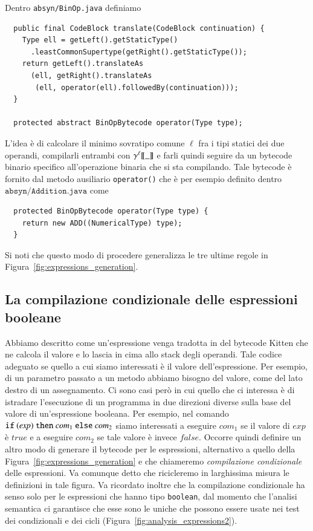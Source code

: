 Dentro \texttt{absyn/BinOp.java} definiamo
%
\begin{verbatim}
  public final CodeBlock translate(CodeBlock continuation) {
    Type ell = getLeft().getStaticType()
      .leastCommonSupertype(getRight().getStaticType());
    return getLeft().translateAs
      (ell, getRight().translateAs
       (ell, operator(ell).followedBy(continuation)));
  }

  protected abstract BinOpBytecode operator(Type type);
\end{verbatim}
%
L'idea \`e di calcolare il minimo sovratipo comune $\ell$
fra i tipi statici dei due operandi, compilarli entrambi con
${\gamma^{{\mathit{\ell}}}[\![{\_}]\!]}$ e farli quindi seguire da un bytecode binario
specifico all'operazione binaria che si sta compilando. Tale bytecode
\`e fornito dal metodo ausiliario \texttt{operator()} che \`e per esempio
definito dentro $\mathtt{absyn/Addition.java}$ come
%
\begin{verbatim}
  protected BinOpBytecode operator(Type type) {
    return new ADD((NumericalType) type);
  }
\end{verbatim}
%
Si noti che questo modo di procedere generalizza le tre ultime regole
in Figura~\ref{fig:expressions_generation}.
%
\subsection{La compilazione condizionale delle espressioni booleane}
  \label{subsec:conditional_generation}
%
Abbiamo descritto come un'espressione venga tradotta in del bytecode
Kitten che ne calcola il valore e lo lascia in cima allo stack degli
operandi. Tale codice \e adeguato se quello a cui
siamo interessati \`e il valore dell'espressione. Per esempio, di un parametro
passato a un metodo abbiamo bisogno del valore, \cosi come del lato destro
di un assegnamento.
Ci sono casi per\`o in cui quello che ci interessa \`e di istradare
l'esecuzione di un programma in due direzioni diverse sulla base
del valore di un'espressione booleana. Per esempio, nel comando
$\mathtt{if\ (\mathit{exp})\ then\ \mathit{com}_{\rm 1}
\ else\ \mathit{com}_{\rm 2}}$
siamo interessati a eseguire $\mathit{com}_1$ se il valore
di $\mathit{exp}$ \`e $\mathit{true}$ e a eseguire $\mathit{com}_2$
se tale valore \`e invece $\mathit{false}$. Occorre quindi definire
un altro modo di generare il bytecode per le espressioni,
alternativo a quello della
Figura~\ref{fig:expressions_generation} e che chiameremo
\emph{compilazione condizionale} delle espressioni. Va comunque detto che
ricicleremo in larghissima misura le definizioni in tale figura. Va ricordato
inoltre che
la compilazione condizionale ha senso solo per le espressioni che hanno
tipo \texttt{boolean},
dal momento che l'analisi semantica ci garantisce che esse sono le uniche
che possono essere usate nei test dei condizionali e dei cicli
(Figura~\ref{fig:analysis_expressions2}).


